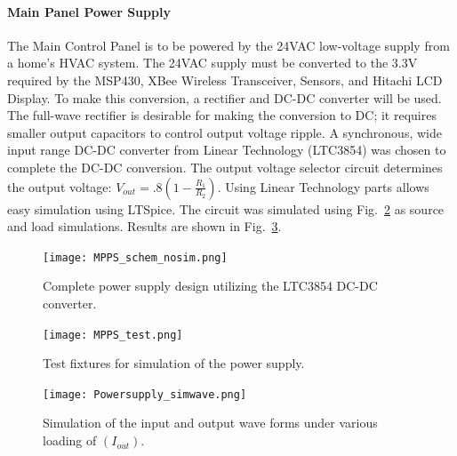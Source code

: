 \paragraph{Main Panel Power Supply}
The Main Control Panel is to be powered by the 24VAC low-voltage supply from a home's HVAC system. The 24VAC supply must be converted to the 3.3V required by the MSP430, XBee Wireless Transceiver, Sensors, and Hitachi LCD Display. To make this conversion, a rectifier and DC-DC converter will be used. The full-wave rectifier is desirable for making the conversion to DC; it requires smaller output capacitors to control output voltage ripple. A synchronous, wide input range DC-DC converter from Linear Technology (LTC3854) was chosen to complete the DC-DC conversion. The output voltage selector circuit determines the output voltage: $V_{out}=.8(1-\frac{R_1}{R_2})$. Using Linear Technology parts allows easy simulation using LTSpice. The circuit was simulated using Fig.~\ref{fig:MPPS_test} as source and load simulations. Results are shown in Fig.~\ref{fig:powersupply_simwave}.
\begin{figure}
\centering
\texttt{[image: MPPS\_schem\_nosim.png]}
\caption{Complete power supply design utilizing the LTC3854 DC-DC converter.}
\label{fig:MPPS_schem_nosim}
\end{figure}
\begin{figure}
\centering
\texttt{[image: MPPS\_test.png]}
\caption{Test fixtures for simulation of the power supply.}
\label{fig:MPPS_test}
\end{figure}
\begin{figure}
\centering
\texttt{[image: Powersupply\_simwave.png]}
\caption{Simulation of the input and output wave forms under various loading of $(I_{out})$.}
\label{fig:powersupply_simwave}
\end{figure}
